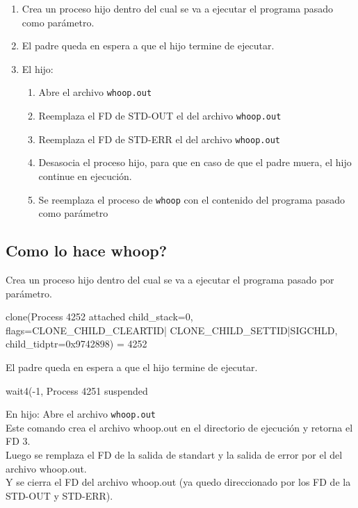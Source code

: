\begin{enumerate}
 \item Crea un proceso hijo dentro del cual se va a ejecutar el programa pasado como par\'ametro.
 \item El padre queda en espera a que el hijo termine de ejecutar.
 \item El hijo:
 \begin{enumerate}
  \item Abre el archivo \verb|whoop.out|
  \item Reemplaza el FD de STD-OUT el del archivo \verb|whoop.out|
  \item Reemplaza el FD de STD-ERR el del archivo \verb|whoop.out|
  \item Desasocia el proceso hijo, para que en caso de que el padre muera, el hijo continue en ejecuci\'on.
  \item Se reemplaza el proceso de \verb|whoop| con el contenido del programa pasado como par\'ametro
 \end{enumerate}
\end{enumerate}

\newpage

\subsection{Como lo hace whoop?}

Crea un proceso hijo dentro del cual se va a ejecutar el programa pasado por par\'ametro.

\begin{framed}
\begin{verbatimtab}
clone(Process 4252 attached child_stack=0, flags=CLONE_CHILD_CLEARTID|
  CLONE_CHILD_SETTID|SIGCHLD, child_tidptr=0x9742898) = 4252
\end{verbatimtab}
\end{framed}

El padre queda en espera a que el hijo termine de ejecutar. 

\begin{framed}
\begin{verbatimtab}
[pid  4251] wait4(-1, Process 4251 suspended
\end{verbatimtab}
\end{framed}

En hijo: Abre el archivo \verb|whoop.out|\\
Este comando crea el archivo whoop.out en el directorio de ejecuci\'on y retorna el FD 3.\\
Luego se remplaza el FD de la salida de standart y la salida de error por el del archivo whoop.out.\\
Y se cierra el FD del archivo whoop.out (ya quedo direccionado por los FD de la STD-OUT y STD-ERR).


